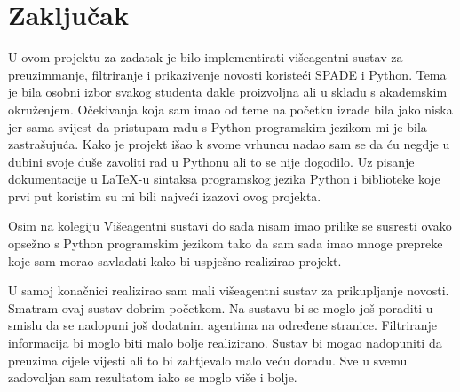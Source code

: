 \documentclass[]{foi} %
\begin{document}
\chapter{Zaključak}

U ovom projektu za zadatak je bilo implementirati višeagentni sustav za preuzimmanje, filtriranje i prikazivenje novosti koristeći SPADE i  Python. Tema je bila osobni izbor svakog studenta dakle proizvoljna ali u skladu s akademskim okruženjem. Očekivanja koja sam imao od teme  na početku izrade bila jako niska jer sama svijest da pristupam radu s Python programskim jezikom mi je bila zastrašujuća. Kako je projekt išao k svome vrhuncu nadao sam se da ću negdje u dubini svoje duše zavoliti rad u Pythonu ali to se nije dogodilo. Uz pisanje dokumentacije u \LaTeX -u sintaksa programskog jezika Python i biblioteke koje prvi put koristim su mi bili najveći izazovi ovog projekta.

Osim na kolegiju Višeagentni sustavi do sada nisam imao prilike se susresti ovako opsežno s Python programskim jezikom tako da sam sada imao mnoge prepreke koje sam morao savladati kako bi uspješno realizirao projekt.

U samoj konačnici realizirao sam mali višeagentni sustav za prikupljanje novosti. Smatram ovaj sustav dobrim početkom. Na sustavu bi se moglo još poraditi u smislu da se nadopuni još dodatnim agentima na određene stranice. Filtriranje informacija bi moglo biti malo bolje realizirano. Sustav bi mogao nadopuniti da preuzima cijele vijesti ali to bi zahtjevalo malo veću doradu. Sve u svemu zadovoljan sam rezultatom iako se moglo više i bolje.

\makebackmatter



\end{document}
